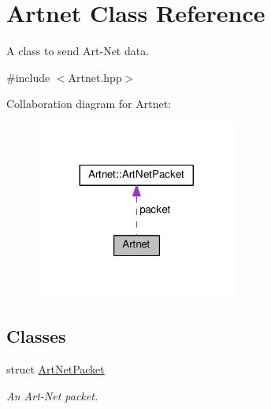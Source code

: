\hypertarget{classArtnet}{}\section{Artnet Class Reference}
\label{classArtnet}


A class to send Art-\/\+Net data.  




{\ttfamily \#include $<$Artnet.\+hpp$>$}



Collaboration diagram for Artnet\+:
\nopagebreak
\begin{figure}[H]
\begin{center}
\leavevmode
\includegraphics[width=188pt]{classArtnet__coll__graph}
\end{center}
\end{figure}
\subsection*{Classes}
\begin{DoxyCompactItemize}
\item 
struct \hyperlink{structArtnet_1_1ArtNetPacket}{Art\+Net\+Packet}
\begin{DoxyCompactList}\small\item\em An Art-\/\+Net packet. \end{DoxyCompactList}\end{DoxyCompactItemize}
